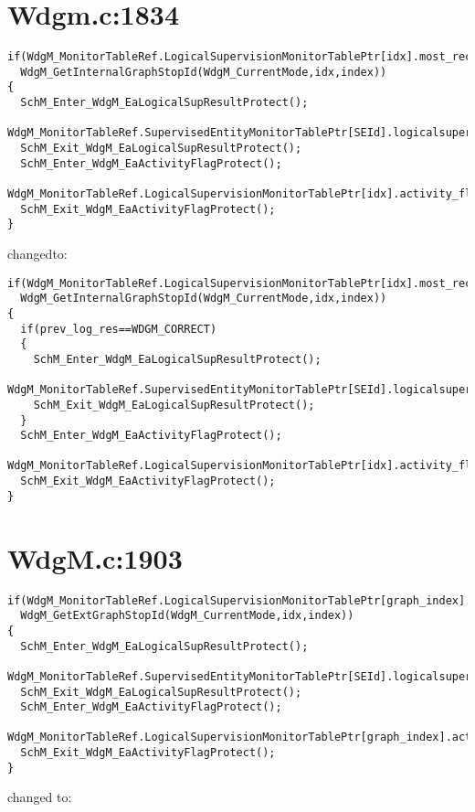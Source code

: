 \documentclass[11pt,a4paper]{article}
\begin{document}
\newpage
\section{Wdgm.c:1834}

\begin{lstlisting}
if(WdgM_MonitorTableRef.LogicalSupervisionMonitorTablePtr[idx].most_recently_reported==
  WdgM_GetInternalGraphStopId(WdgM_CurrentMode,idx,index))
{
  SchM_Enter_WdgM_EaLogicalSupResultProtect();
  WdgM_MonitorTableRef.SupervisedEntityMonitorTablePtr[SEId].logicalsupervision_result=WDGM_CORRECT;
  SchM_Exit_WdgM_EaLogicalSupResultProtect();
  SchM_Enter_WdgM_EaActivityFlagProtect();
  WdgM_MonitorTableRef.LogicalSupervisionMonitorTablePtr[idx].activity_flag=FALSE;
  SchM_Exit_WdgM_EaActivityFlagProtect();
}
\end{lstlisting}

changedto:

\begin{lstlisting}
if(WdgM_MonitorTableRef.LogicalSupervisionMonitorTablePtr[idx].most_recently_reported==
  WdgM_GetInternalGraphStopId(WdgM_CurrentMode,idx,index))
{
  if(prev_log_res==WDGM_CORRECT)
  {
    SchM_Enter_WdgM_EaLogicalSupResultProtect();
    WdgM_MonitorTableRef.SupervisedEntityMonitorTablePtr[SEId].logicalsupervision_result=WDGM_CORRECT;
    SchM_Exit_WdgM_EaLogicalSupResultProtect();
  }
  SchM_Enter_WdgM_EaActivityFlagProtect();
  WdgM_MonitorTableRef.LogicalSupervisionMonitorTablePtr[idx].activity_flag=FALSE;
  SchM_Exit_WdgM_EaActivityFlagProtect();
}
\end{lstlisting}

\newpage
\section{WdgM.c:1903}

\begin{lstlisting}
if(WdgM_MonitorTableRef.LogicalSupervisionMonitorTablePtr[graph_index].most_recently_reported==
  WdgM_GetExtGraphStopId(WdgM_CurrentMode,idx,index))
{
  SchM_Enter_WdgM_EaLogicalSupResultProtect();
  WdgM_MonitorTableRef.SupervisedEntityMonitorTablePtr[SEId].logicalsupervision_result=WDGM_CORRECT;
  SchM_Exit_WdgM_EaLogicalSupResultProtect();
  SchM_Enter_WdgM_EaActivityFlagProtect();
  WdgM_MonitorTableRef.LogicalSupervisionMonitorTablePtr[graph_index].activity_flag=FALSE;
  SchM_Exit_WdgM_EaActivityFlagProtect();
}
\end{lstlisting}

changed to:
\end{document}
